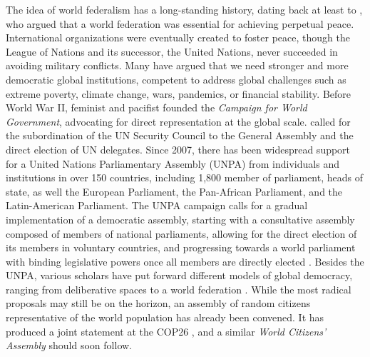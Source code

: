 The idea of world federalism has a long-standing history, dating back at least to , who argued that a world federation was essential for achieving perpetual peace. 
International organizations were eventually created to foster peace, though the League of Nations and its successor, the United Nations, never succeeded in avoiding military conflicts. 
Many have argued that we need stronger and more democratic global institutions, competent to address global challenges such as extreme poverty, climate change, wars, pandemics, or financial stability. 
Before World War II, feminist and pacifist  founded the \textit{Campaign for World Government}, advocating for direct representation at the global scale. 
 called for the subordination of the UN Security Council to the General Assembly and the direct election of UN delegates. 
Since 2007, there has been widespread support for a United Nations Parliamentary Assembly (UNPA) from individuals and institutions in over 150 countries, including 1,800 member of parliament, heads of state, as well the European Parliament, the Pan-African Parliament, and the Latin-American Parliament. The UNPA campaign calls for a gradual implementation of a democratic assembly, starting with a consultative assembly composed of members of national parliaments, allowing for the direct election of its members in voluntary countries, and progressing towards a world parliament with binding legislative powers once all members are directly elected . %
Besides the UNPA, various scholars have put forward different models of global democracy, ranging from deliberative spaces to a world federation . %
While the most radical proposals may still be on the horizon, an assembly of random citizens representative of the world population has already been convened. It has produced a joint statement at the COP26 , and a similar \textit{World Citizens' Assembly} should soon follow. 



